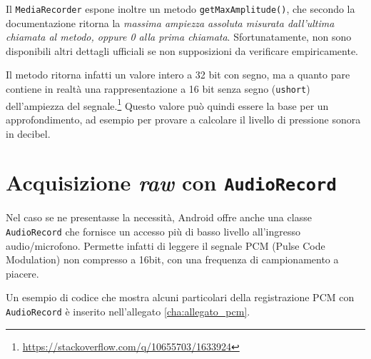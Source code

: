 
Il \texttt{MediaRecorder} espone inoltre un metodo \texttt{getMaxAmplitude()}, che secondo la documentazione ritorna la \emph{massima ampiezza assoluta misurata dall'ultima chiamata al metodo, oppure 0 alla prima chiamata}.\footnotemark{} Sfortunatamente, non sono disponibili altri dettagli ufficiali se non supposizioni da verificare empiricamente.


Il metodo ritorna infatti un valore intero a 32 bit con segno, ma a quanto pare contiene in realtà una rappresentazione a 16 bit senza segno (\texttt{ushort}) dell'ampiezza del segnale.\footnote{\url{https://stackoverflow.com/q/10655703/1633924}} Questo valore può quindi essere la base per un approfondimento, ad esempio per provare a calcolare il livello di pressione sonora in decibel.

\section{Acquisizione \emph{raw} con \texttt{AudioRecord}}
\label{sec:audio_audiorecord}

Nel caso se ne presentasse la necessità, Android offre anche una classe \texttt{AudioRecord} che fornisce un accesso più di basso livello all'ingresso audio/microfono. Permette infatti di leggere il segnale PCM (Pulse Code Modulation) non compresso a 16bit, con una frequenza di campionamento a piacere.

Un esempio di codice che mostra alcuni particolari della registrazione PCM con \texttt{AudioRecord} è inserito nell'allegato \ref{cha:allegato_pcm}.

